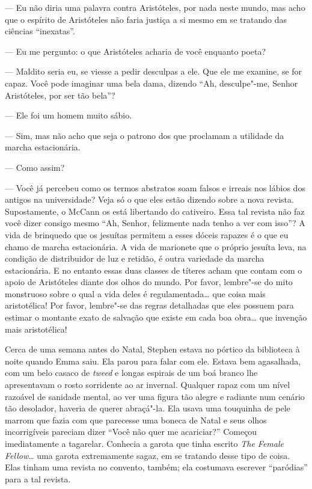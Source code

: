 --- Eu não diria uma palavra contra Aristóteles, por nada neste mundo, mas acho
que o espírito de Aristóteles não faria justiça a si mesmo em se tratando das
ciências “inexatas”.

--- Eu me pergunto: o que Aristóteles acharia de você enquanto poeta?

--- Maldito seria eu, se viesse a pedir desculpas a ele.  Que ele me examine,
se for capaz.  Você pode imaginar uma bela dama, dizendo “Ah, desculpe"-me,
Senhor Aristóteles, por ser tão bela”?

--- Ele foi um homem muito sábio.

--- Sim, mas não acho que seja o patrono dos que proclamam a utilidade da
marcha estacionária.

--- Como assim?

--- Você já percebeu como os termos abstratos soam falsos e irreais nos lábios
dos antigos na universidade?  Veja só o que eles estão dizendo sobre a nova
revista.  Supostamente, o McCann os está libertando do cativeiro.  Essa tal
revista não faz você dizer consigo mesmo “Ah, Senhor, felizmente nada tenho a
ver com isso”?  A vida de brinquedo que os jesuítas permitem a esses dóceis
rapazes é o que eu chamo de marcha estacionária.  A vida de marionete que o
próprio jesuíta leva, na condição de distribuidor de luz e retidão, é outra
variedade da marcha estacionária.  E no entanto essas duas classes de títeres
acham que contam com o apoio de Aristóteles diante dos olhos do mundo.  Por
favor, lembre"-se do mito monstruoso sobre o qual a vida deles é
regulamentada\ldots{} que coisa mais aristotélica!  Por favor, lembre"-se das regras
detalhadas que eles possuem para estimar o montante exato de salvação que
existe em cada boa obra\ldots{} que invenção mais aristotélica!

Cerca de uma semana antes do Natal, Stephen estava no pórtico da biblioteca à
noite quando Emma saiu.  Ela parou para falar com ele.  Estava bem agasalhada,
com um belo casaco de \textit{tweed} e longas espirais de um boá branco lhe
apresentavam o rosto sorridente ao ar invernal.  Qualquer rapaz com um nível
razoável de sanidade mental, ao ver uma figura tão alegre e radiante num
cenário tão desolador, haveria de querer abraçá"-la.  Ela usava uma touquinha de
pele marrom que fazia com que parecesse uma boneca de Natal e seus olhos
incorrigíveis pareciam dizer “Você não quer me acariciar?”  Começou
imediatamente a tagarelar.  Conhecia a garota que tinha escrito \textit{The
Female Fellow}\ldots{} uma garota extremamente sagaz, em se tratando desse tipo de
coisa.  Elas tinham uma revista no convento, também; ela costumava escrever
“paródias” para a tal revista.

